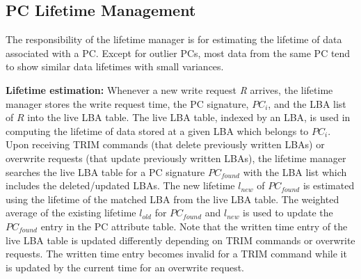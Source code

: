 

\subsection{PC Lifetime Management}
The responsibility of the lifetime manager is for estimating the lifetime of
data associated with a PC. 
{\color{blue}
Except for outlier PCs, most data from the same PC tend to show similar 
data lifetimes with small variances.
}

\textbf{Lifetime estimation:}
{\color{blue}
Whenever a new write request {\it R} arrives, 
the lifetime manager stores the write request time,
the PC signature, $PC_i$, and the LBA list of {$R$} into the live LBA table.
The live LBA table, indexed by an LBA, is used in computing the lifetime of data stored
at a given LBA which belongs to $PC_i$.
Upon receiving TRIM commands (that delete previously written LBAs)
or overwrite requests (that update previously
written LBAs), the lifetime manager searches the live LBA table for a PC
signature $PC_{found}$ with the LBA list which includes the deleted/updated LBAs.
The new lifetime $l_{new}$ of $PC_{found}$ is estimated using the lifetime 
of the matched LBA from the live LBA table. The weighted average of the existing
lifetime $l_{old}$ for $PC_{found}$ and $l_{new}$ is used to update the $PC_{found}$
entry in the PC attribute table.
Note that the written time entry of the live LBA table is updated differently 
depending on TRIM commands or overwrite requests.
The written time entry becomes invalid for a TRIM command while it is updated by 
the current time for an overwrite request.
}

